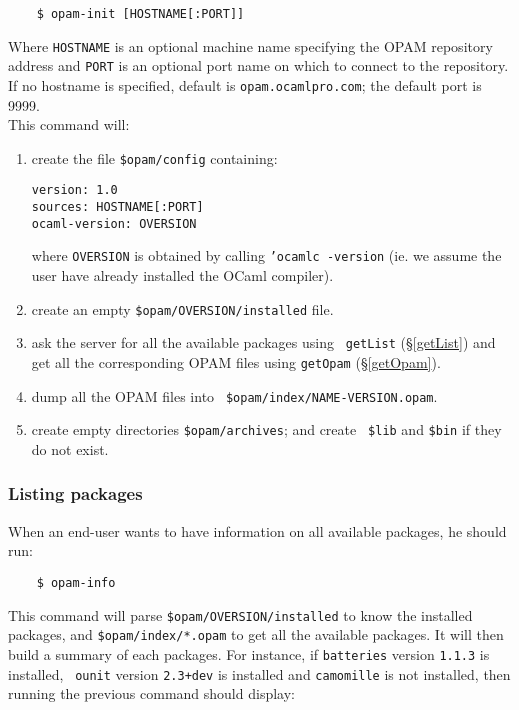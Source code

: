 \documentclass[a4paper,11pt]{article}
\begin{document}
\begin{verbatim}
    $ opam-init [HOSTNAME[:PORT]]
\end{verbatim}

Where {\tt HOSTNAME} is an optional machine name specifying the OPAM
repository address and {\tt PORT} is an optional port name on which to
connect to the repository. If no hostname is specified, default is
{\tt opam.ocamlpro.com}; the default port is 9999. \\

This command will:

\begin{enumerate}

\item create the file {\tt \$opam/config} containing:

\begin{verbatim}
version: 1.0
sources: HOSTNAME[:PORT]
ocaml-version: OVERSION
\end{verbatim}

where {\tt OVERSION} is obtained by calling {\tt 'ocamlc -version}
(ie. we assume the user have already installed the OCaml compiler).

\item create an empty {\tt \$opam/OVERSION/installed} file.

\item ask the server for all the available packages using {\tt
  getList} (\S\ref{getList}) and get all the corresponding OPAM files
  using {\tt getOpam} (\S\ref{getOpam}).

\item dump all the OPAM files into {\tt
  \$opam/index/NAME-VERSION.opam}.

\item create empty directories {\tt \$opam/archives}; and create {\tt
  \$lib} and {\tt \$bin} if they do not exist.

\end{enumerate}

\subsubsection{Listing packages}

When an end-user wants to have information on all available packages,
he should run:

\begin{verbatim}
    $ opam-info
\end{verbatim}

This command will parse {\tt \$opam/OVERSION/installed} to know the
installed packages, and {\tt \$opam/index/*.opam} to get all the
available packages. It will then build a summary of each packages. For
instance, if {\tt batteries} version {\tt 1.1.3} is installed, {\tt
  ounit} version {\tt 2.3+dev} is installed and {\tt camomille} is not
installed, then running the previous command should display:
\end{document}
